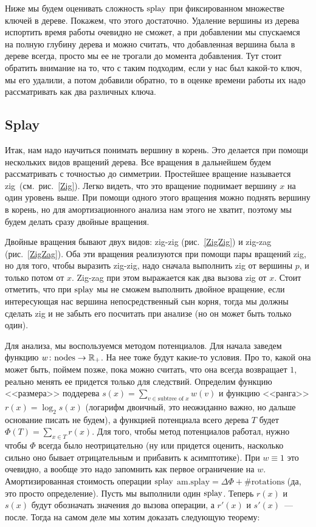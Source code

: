 Ниже мы будем оценивать сложность $\operatorname{splay}$ при фиксированном множестве ключей в дереве. Покажем, что этого достаточно. Удаление вершины из дерева испортить время работы очевидно не сможет, а при добавлении мы спускаемся на полную глубину дерева и можно считать, что добавленная вершина была в дереве всегда, просто мы ее не трогали до момента добавления. Тут стоит обратить внимание на то, что с таким подходим, если у нас был какой-то ключ, мы его удалили, а потом добавили обратно, то в оценке времени работы их надо рассматривать как два различных ключа.

\subsection{Splay}



Итак, нам надо научиться понимать вершину в корень. Это делается при помощи нескольких видов вращений дерева. Все вращения в дальнейшем будем рассматривать с точностью до симметрии. Простейшее вращение называется zig~(см.~рис.~\ref{Zig}). Легко видеть, что это вращение поднимает вершину $x$ на один уровень выше. При помощи одного этого вращения можно поднять вершину в корень, но для амортизационного анализа нам этого не хватит, поэтому мы будем делать сразу двойные вращения.





Двойные вращения бывают двух видов: zig-zig (рис.~\ref{ZigZig}) и zig-zag (рис.~\ref{ZigZag}). Оба эти вращения реализуются при помощи пары вращений zig, но для того, чтобы выразить zig-zig, надо сначала выполнить zig от вершины $p$, и только потом от $x$. Zig-zag при этом выражается как два вызова zig от $x$. Стоит отметить, что при $\operatorname{splay}$ мы не сможем выполнить двойное вращение, если интересующая нас вершина непосредственный сын корня, тогда мы должны сделать zig и не забыть его посчитать при анализе (но он может быть только один).

Для анализа, мы воспользуемся методом потенциалов. Для начала заведем функцию $w \colon \text{nodes} \to {\mathbb R}_{+}$. На нее тоже будут какие-то условия. Про то, какой она может быть, поймем позже, пока можно считать, что она всегда возвращает $1$, реально менять ее придется только для следствий. Определим функцию <<размера>> поддерева $s(x) = \sum_{v \in \text{subtree of } x} w(v)$ и функцию <<ранга>> $r(x) = \log_2 s(x)$ (логарифм двоичный, это неожиданно важно, но дальше основание писать не будем), а функцией потенциала всего дерева $T$ будет $\Phi(T) = \sum_{x \in T} r(x)$. Для того, чтобы метод потенциалов работал, нужно чтобы $\Phi$ всегда было неотрицательно (ну или придется оценить, насколько сильно оно бывает отрицательным и прибавить к асимптотике). При $w \equiv 1$ это очевидно, а вообще это надо запомнить как первое ограничение на $w$. Амортизированная стоимость операции $\operatorname{splay}$ $\text{am.splay} = \Delta\Phi + \#\text{rotations}$ (да, это просто определение). Пусть мы выполнили один $\operatorname{splay}$. Теперь $r(x)$ и $s(x)$ будут обозначать значения до вызова операции, а $r'(x)$ и $s'(x)$~--- после. Тогда на самом деле мы хотим доказать следующую теорему:

